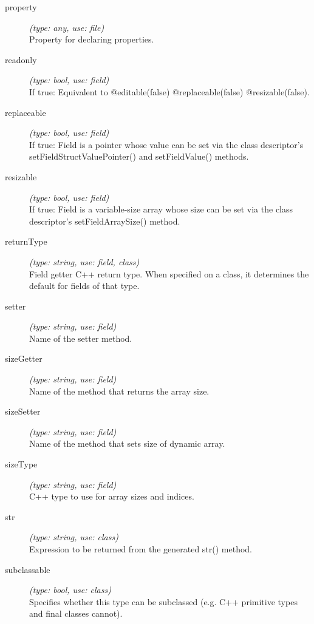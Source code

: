 \begin{description}
\item[property] \textit{(type: any, use: file)} \\
    Property for declaring properties.

\item[readonly] \textit{(type: bool, use: field)} \\
    If true: Equivalent to @editable(false) @replaceable(false)
    @resizable(false).

\item[replaceable] \textit{(type: bool, use: field)} \\
    If true: Field is a pointer whose value can be set via the class
    descriptor's setFieldStructValuePointer() and setFieldValue() methods.

\item[resizable] \textit{(type: bool, use: field)} \\
    If true: Field is a variable-size array whose size can be set via the class
    descriptor's setFieldArraySize() method.

\item[returnType] \textit{(type: string, use: field, class)} \\
    Field getter C++ return type. When specified on a class, it determines the
    default for fields of that type.

\item[setter] \textit{(type: string, use: field)} \\
    Name of the setter method.

\item[sizeGetter] \textit{(type: string, use: field)} \\
    Name of the method that returns the array size.

\item[sizeSetter] \textit{(type: string, use: field)} \\
    Name of the method that sets size of dynamic array.

\item[sizeType] \textit{(type: string, use: field)} \\
    C++ type to use for array sizes and indices.

\item[str] \textit{(type: string, use: class)} \\
    Expression to be returned from the generated str() method.

\item[subclassable] \textit{(type: bool, use: class)} \\
    Specifies whether this type can be subclassed (e.g. C++ primitive types and
    final classes cannot).


\end{description}
